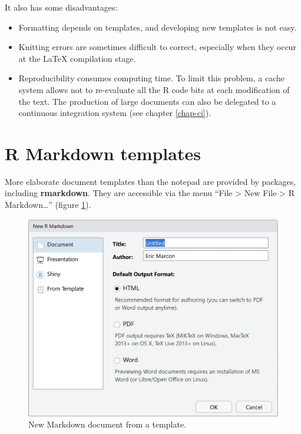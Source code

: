 \documentclass[
  12pt,
  american,
  a4paper,
  extrafontsizes,onecolumn,openright
  ]{memoir}
\providecommand{\tightlist}{%
  \setlength{\itemsep}{0pt}\setlength{\parskip}{0pt}}
\begin{document}
It also has some disadvantages:

\begin{itemize}
\tightlist
\item
  Formatting depends on templates, and developing new templates is not easy.
\item
  Knitting errors are sometimes difficult to correct, especially when they occur at the LaTeX compilation stage.
\item
  Reproducibility consumes computing time.
  To limit this problem, a cache system allows not to re-evaluate all the R code bits at each modification of the text.
  The production of large documents can also be delegated to a continuous integration system (see chapter \ref{chap-ci}).
\end{itemize}

\hypertarget{r-markdown-templates}{%
\section{R Markdown templates}\label{r-markdown-templates}}

More elaborate document templates than the notepad are provided by packages, including \textbf{rmarkdown}.
They are accessible via the menu \enquote{File \textgreater{} New File \textgreater{} R Markdown\ldots{}} (figure \ref{fig:e-rmd1}).



\scriptsize

\begin{figure}

{\centering \includegraphics[width=0.8\linewidth]{images/e-rmd1} 

}

\caption{New Markdown document from a template.}\label{fig:e-rmd1}
\end{figure}
\end{document}
